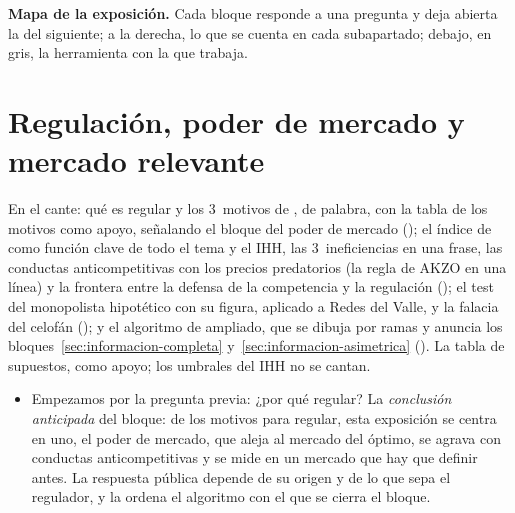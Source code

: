 \documentclass[11pt]{article}
\begin{document}
\begin{anotaciones}
\textbf{Mapa de la exposición.} Cada bloque responde a una pregunta y deja abierta la del siguiente; a la derecha, lo que se cuenta en cada subapartado; debajo, en gris, la herramienta con la que trabaja.
\begin{infografiacaja}
\caption{Mapa del tema: la pregunta de cada bloque, sus subapartados y el hilo que los une}\label{figu:mapa-tema}
\end{infografiacaja}
\end{anotaciones}



\section{Regulación, poder de mercado\cortetitulo{} y mercado relevante}\label{sec:regulacion-poder-mercado}

\begin{notaopositor}
En el cante: qué es regular y los 3~motivos de , de palabra, con la tabla de los motivos como apoyo, señalando el bloque del poder de mercado (); el índice de  como función clave de todo el tema y el IHH, las 3~ineficiencias en una frase, las conductas anticompetitivas con los precios predatorios (la regla de AKZO en una línea) y la frontera entre la defensa de la competencia y la regulación (); el test del monopolista hipotético con su figura, aplicado a Redes del Valle, y la falacia del celofán (); y el algoritmo de  ampliado, que se dibuja por ramas y anuncia los bloques~\ref{sec:informacion-completa} y~\ref{sec:informacion-asimetrica} (). La tabla de supuestos, como apoyo; los umbrales del IHH no se cantan.
\end{notaopositor}

\begin{itemize}
\item Empezamos por la pregunta previa: ¿por qué regular? La \emph{conclusión anticipada} del bloque: de los motivos para regular, esta exposición se centra en uno, el poder de mercado, que aleja al mercado del óptimo, se agrava con conductas anticompetitivas y se mide en un mercado que hay que definir antes. La respuesta pública depende de su origen y de lo que sepa el regulador, y la ordena el algoritmo con el que se cierra el bloque.
\end{itemize}
\end{document}
